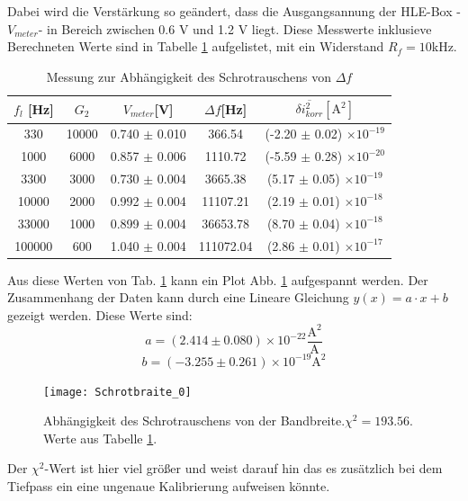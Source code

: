 Dabei wird die Verstärkung so geändert, dass die Ausgangsannung der HLE-Box -\(V_{meter}\)- in Bereich zwischen 0.6 V und 1.2 V liegt. 
Diese Messwerte inklusieve Berechneten Werte sind in Tabelle \ref{tab:schrotbreite} aufgelistet, mit ein Widerstand \(R_f = 10\)kHz. 

\begin{table}[H]
    \centering
    \begin{tabular}{c|c|c|c|c}
        \(f_l\) [Hz] & \(G_2\) & \(V_{meter}\)[V] & \(\Delta f\)[Hz] & \(\overline{\delta i_{korr}^2}[\text{A}^2]\) \\
        \hline
        330 & 10000 & 0.740 \(\pm\) 0.010 & 366.54 & (-2.20 \(\pm\) 0.02) \(\times 10^{-19}\) \\
        1000 & 6000 & 0.857 \(\pm\) 0.006 & 1110.72 & (-5.59 \(\pm\) 0.28) \(\times 10^{-20}\) \\
        3300 & 3000 & 0.730 \(\pm\) 0.004 & 3665.38 & (5.17 \(\pm\) 0.05) \(\times 10^{-19}\) \\
        10000 & 2000& 0.992 \(\pm\) 0.004 & 11107.21 & (2.19 \(\pm\) 0.01) \(\times 10^{-18}\) \\
        33000 & 1000 & 0.899 \(\pm\) 0.004 & 36653.78 & (8.70 \(\pm\) 0.04) \(\times 10^{-18}\) \\
        100000 & 600 & 1.040 \(\pm\) 0.004 & 111072.04 & (2.86 \(\pm\) 0.01) \(\times 10^{-17}\)
    \end{tabular}
    \caption{Messung zur Abhängigkeit des Schrotrauschens von \(\Delta f\)}
    \label{tab:schrotbreite}
\end{table}

Aus diese Werten von Tab. \ref{tab:schrotbreite} kann ein Plot Abb. \ref{fig:schrotbraite} aufgespannt werden. 
Der Zusammenhang der Daten kann durch eine Lineare Gleichung \(y(x) = a \cdot x +b\) gezeigt werden. 
Diese Werte sind:
\begin{equation*}
    a = (2.414 \pm 0.080) \times 10^{-22} \frac{\text{A}^2}{\text{A}}
\end{equation*}
\begin{equation*}
    b = (-3.255 \pm 0.261) \times 10^{-19} \text{A}^2
\end{equation*}
\FloatBarrier
\begin{figure} [htbp]
    \centering
    \texttt{[image: Schrotbraite\_0]}
    \caption{Abhängigkeit des Schrotrauschens von der Bandbreite.\(\chi^2 = 193.56\). Werte aus Tabelle \ref{tab:schrotbreite}.}
    \label{fig:schrotbraite}
\end{figure}
\FloatBarrier
Der $\chi^2$-Wert ist hier viel größer und weist darauf hin das es zusätzlich bei dem Tiefpass ein eine ungenaue Kalibrierung aufweisen könnte.


